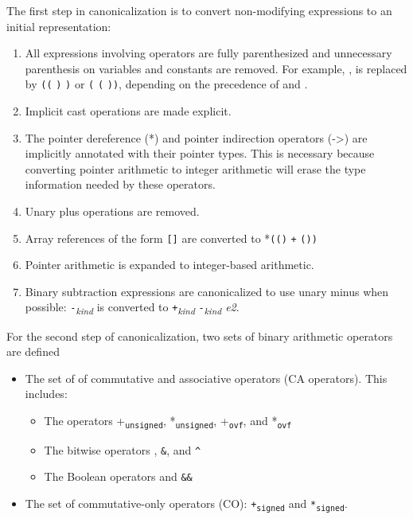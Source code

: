 The first step in canonicalization is to convert non-modifying
expressions to an initial representation:

\begin{enumerate}
\item
  All expressions involving operators are fully parenthesized and
  unnecessary parenthesis on variables and constants are removed. For
  example,     , is
  replaced by \texttt{((}  \texttt{)}
   \texttt{)} or \texttt{(} 
  \texttt{(}  \texttt{))}, depending on the
  precedence of  and .
\item
  Implicit cast operations are made explicit.
\item
  The pointer dereference (*) and pointer indirection operators
  (-\textgreater{}) are implicitly annotated with their pointer types.
  This is necessary because converting pointer arithmetic to integer
  arithmetic will erase the type information needed by these operators.
\item
  Unary plus operations are removed.
\item
  Array references of the form
  \texttt{[}\texttt{]} are converted to
  *\texttt{((}\texttt{)} \texttt{+}
  \texttt{(}\texttt{))}
\item
  Pointer arithmetic is expanded to integer-based arithmetic.
\item
  Binary subtraction expressions are canonicalized to use unary minus
  when possible:  \texttt{-}\emph{\textsubscript{kind}}
   is converted to 
  \texttt{+}\emph{\textsubscript{kind}}
  \texttt{-}\emph{\textsubscript{kind} e2}.
\end{enumerate}

For the second step of canonicalization, two sets of binary arithmetic
operators are defined

\begin{itemize}
\item
  The set of of commutative and associative operators (CA operators).
  This includes:

  \begin{itemize}
  \item
    The operators +\texttt{\textsubscript{unsigned}},
    *\texttt{\textsubscript{unsigned}}, +\texttt{\textsubscript{ovf}},
    and *\texttt{\textsubscript{ovf}}
  \item
    The bitwise operators \texttt{\textbar{}}, \texttt{\&}, and
    \texttt{\^{}}
  \item
    The Boolean operators \texttt{\textbar{}\textbar{}} and
    \texttt{\&\&}
  \end{itemize}
\item
  The set of commutative-only operators (CO):
  \texttt{+\textsubscript{signed}} and \texttt{*\textsubscript{signed}}.
\end{itemize}


